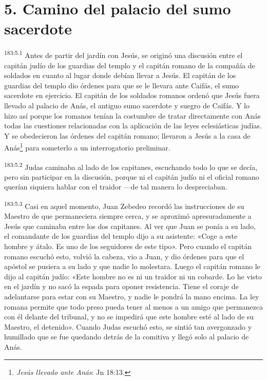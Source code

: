 \section*{5. Camino del palacio del sumo sacerdote}
\par 
\textsuperscript{183:5.1} Antes de partir del jardín con Jesús, se originó una discusión entre el capitán judío de los guardias del templo y el capitán romano de la compañía de soldados en cuanto al lugar donde debían llevar a Jesús. El capitán de los guardias del templo dio órdenes para que se le llevara ante Caifás, el sumo sacerdote en ejercicio. El capitán de los soldados romanos ordenó que Jesús fuera llevado al palacio de Anás, el antiguo sumo sacerdote y suegro de Caifás. Y lo hizo así porque los romanos tenían la costumbre de tratar directamente con Anás todas las cuestiones relacionadas con la aplicación de las leyes eclesiásticas judías. Y se obedecieron las órdenes del capitán romano; llevaron a Jesús a la casa de Anás\footnote{\textit{Jesús llevado ante Anás}: Jn 18:13.} para someterlo a un interrogatorio preliminar.

\par 
\textsuperscript{183:5.2} Judas caminaba al lado de los capitanes, escuchando todo lo que se decía, pero sin participar en la discusión, porque ni el capitán judío ni el oficial romano querían siquiera hablar con el traidor ---de tal manera lo despreciaban.

\par 
\textsuperscript{183:5.3} Casi en aquel momento, Juan Zebedeo recordó las instrucciones de su Maestro de que permaneciera siempre cerca, y se aproximó apresuradamente a Jesús que caminaba entre los dos capitanes. Al ver que Juan se ponía a su lado, el comandante de los guardias del templo dijo a su asistente: «Coge a este hombre y átalo. Es uno de los seguidores de este tipo». Pero cuando el capitán romano escuchó esto, volvió la cabeza, vio a Juan, y dio órdenes para que el apóstol se pusiera a su lado y que nadie lo molestara. Luego el capitán romano le dijo al capitán judío: «Este hombre no es ni un traidor ni un cobarde. Lo he visto en el jardín y no sacó la espada para oponer resistencia. Tiene el coraje de adelantarse para estar con su Maestro, y nadie le pondrá la mano encima. La ley romana permite que todo preso pueda tener al menos a un amigo que permanezca con él delante del tribunal, y no se impedirá que este hombre esté al lado de su Maestro, el detenido». Cuando Judas escuchó esto, se sintió tan avergonzado y humillado que se fue quedando detrás de la comitiva y llegó solo al palacio de Anás.


